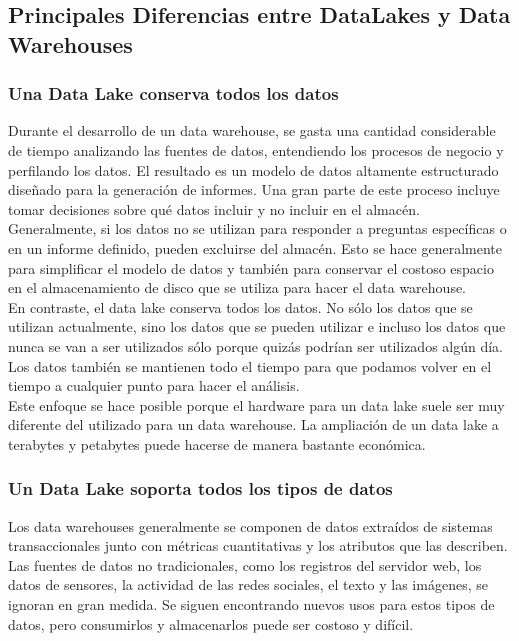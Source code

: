 \documentclass[preprint,12pt]{elsarticle}
\begin{document}
\subsection{Principales Diferencias entre DataLakes y Data Warehouses}

\subsubsection{Una Data Lake conserva todos los datos}

Durante el desarrollo de un data warehouse, se gasta una cantidad considerable de tiempo analizando las fuentes de datos, entendiendo los procesos de negocio y perfilando los datos. El resultado es un modelo de datos altamente estructurado diseñado para la generación de informes. Una gran parte de este proceso incluye tomar decisiones sobre qué datos incluir y no incluir en el almacén. Generalmente, si los datos no se utilizan para responder a preguntas específicas o en un informe definido, pueden excluirse del almacén. Esto se hace generalmente para simplificar el modelo de datos y también para conservar el costoso espacio en el almacenamiento de disco que se utiliza para hacer el data warehouse.\\

En contraste, el data lake conserva todos los datos. No sólo los datos que se utilizan actualmente, sino los datos que se pueden utilizar e incluso los datos que nunca se van a ser utilizados sólo porque quizás podrían ser utilizados algún día. Los datos también se mantienen todo el tiempo para que podamos volver en el tiempo a cualquier punto para hacer el análisis.\\

Este enfoque se hace posible porque el hardware para un data lake suele ser muy diferente del utilizado para un data warehouse. La ampliación de un data lake a terabytes y petabytes puede hacerse de manera bastante económica.\\

\subsubsection{Un Data Lake soporta todos los tipos de datos}

Los data warehouses generalmente se componen de datos extraídos de sistemas transaccionales junto con métricas cuantitativas y los atributos que las describen. Las fuentes de datos no tradicionales, como los registros del servidor web, los datos de sensores, la actividad de las redes sociales, el texto y las imágenes, se ignoran en gran medida. Se siguen encontrando nuevos usos para estos tipos de datos, pero consumirlos y almacenarlos puede ser costoso y difícil.\\
\end{document}
